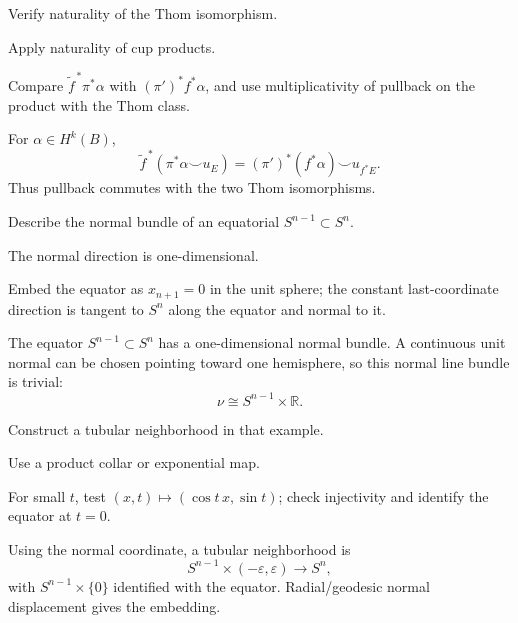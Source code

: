 \begin{exercise}\label{exr:viii31-09}
Verify naturality of the Thom isomorphism.
\end{exercise}
\begin{hint}
Apply naturality of cup products.

Compare \(\widetilde f^{\,*}\pi^*\alpha\) with \((\pi')^*f^*\alpha\), and use multiplicativity of pullback on the product with the Thom class.
\end{hint}
\begin{solution}
For \(\alpha\in H^k(B)\),
\[
\widetilde f^{\,*}(\pi^*\alpha\smile u_E)
=(\pi')^*(f^*\alpha)\smile u_{f^*E}.
\]
Thus pullback commutes with the two Thom isomorphisms.
\end{solution}

\begin{exercise}\label{exr:viii31-10}
Describe the normal bundle of an equatorial $S^{n-1}\subset S^n$.
\end{exercise}
\begin{hint}
The normal direction is one-dimensional.

Embed the equator as \(x_{n+1}=0\) in the unit sphere; the constant last-coordinate direction is tangent to \(S^n\) along the equator and normal to it.
\end{hint}
\begin{solution}
The equator \(S^{n-1}\subset S^n\) has a one-dimensional normal bundle. A continuous unit normal can be chosen pointing toward one hemisphere, so this normal line bundle is trivial:
\[
\nu\cong S^{n-1}\times\mathbb R.
\]
\end{solution}

\begin{exercise}\label{exr:viii31-11}
Construct a tubular neighborhood in that example.
\end{exercise}
\begin{hint}
Use a product collar or exponential map.

For small \(t\), test \((x,t)\mapsto(\cos t\,x,\sin t)\); check injectivity and identify the equator at \(t=0\).
\end{hint}
\begin{solution}
Using the normal coordinate, a tubular neighborhood is
\[
S^{n-1}\times(-\varepsilon,\varepsilon)\longrightarrow S^n,
\]
with \(S^{n-1}\times\{0\}\) identified with the equator. Radial/geodesic normal displacement gives the embedding.
\end{solution}

